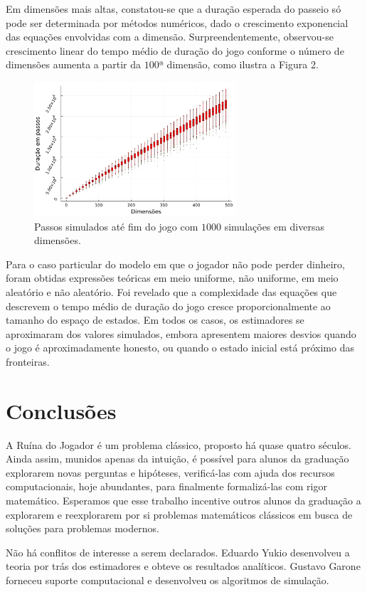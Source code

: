 \documentclass[a4paper,10pt,twocolumn]{article}
\begin{document}
Em dimensões mais altas, constatou-se que a duração esperada do passeio só pode
ser determinada por métodos numéricos, dado o crescimento exponencial das
equações envolvidas com a dimensão. Surpreendentemente, observou-se crescimento
linear do tempo médio de duração do jogo conforme o número de dimensões aumenta
a partir da $100$ª dimensão, como ilustra a Figura 2.

\begin{figure}[h]
    \centering
    \includegraphics[width=7.5cm]{"boxplots.pdf"}
    \centering
    \caption{Passos simulados até fim do jogo com $1000$ simulações em diversas
    dimensões.}
\end{figure}

Para o caso particular do modelo em que o jogador não pode perder dinheiro,
foram obtidas expressões teóricas em meio uniforme, não uniforme, em meio
aleatório e não aleatório. Foi revelado que a complexidade das equações que
descrevem o tempo médio de duração do jogo cresce proporcionalmente ao tamanho
do espaço de estados. Em todos os casos, os estimadores se aproximaram dos
valores simulados, embora apresentem maiores desvios quando o jogo é
aproximadamente honesto, ou quando o estado inicial está próximo das fronteiras.

\section{Conclusões}

A Ruína do Jogador é um problema clássico, proposto há quase quatro séculos.
Ainda assim, munidos apenas da intuição, é possível para alunos da graduação
explorarem novas perguntas e hipóteses, verificá-las com ajuda dos recursos
computacionais, hoje abundantes, para finalmente formalizá-las com rigor
matemático. Esperamos que esse trabalho incentive outros alunos da graduação a
explorarem e reexplorarem por si problemas matemáticos clássicos em busca de
soluções para problemas modernos.

Não há conflitos de interesse a serem declarados. Eduardo Yukio desenvolveu a
teoria por trás dos estimadores e obteve os resultados analíticos. Gustavo
Garone forneceu suporte computacional e desenvolveu os algoritmos de simulação.
\end{document}
